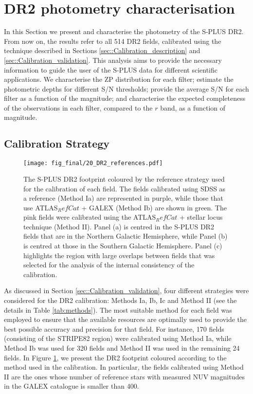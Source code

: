 \documentclass[fleqn,usenatbib]{mnras}
\begin{document}
\section{DR2 photometry characterisation}
\label{sec::DR2}

In this Section we present and characterise the photometry of the S-PLUS DR2. From now on, the results refer to all 514 DR2 fields,  calibrated using the technique described in Sections \ref{sec::Calibration_description} and \ref{sec::Calibration_validation}. This analysis aims to provide the necessary information to guide the user of the S-PLUS data for different scientific applications. We characterise the ZP distribution for each filter; estimate the photometric depths for different S/N thresholds; provide the average S/N for each filter as a function of the magnitude; and characterise the expected completeness of the observations in each filter, compared to the $r$ band, as a function of magnitude.

\subsection{Calibration Strategy}

\begin{figure}
\centering
\texttt{[image: fig\_final/20\_DR2\_references.pdf]}
\caption{The S-PLUS DR2 footprint coloured by the reference strategy used for the calibration of each field. The fields calibrated using SDSS as a reference  (Method Ia) are represented in purple, while those that use ATLAS$_RefCat$ + GALEX (Method Ib) are shown in green. The pink fields were calibrated using the ATLAS$_RefCat$ + stellar locus technique (Method II). Panel (a) is centred in the S-PLUS DR2 fields that are in the Northern Galactic Hemisphere, while Panel (b) is centred at those in the Southern Galactic Hemisphere. Panel (c) highlights the region with large overlaps between fields that was selected for the analysis of the internal consistency of the calibration.}
\label{fig:footprint_reference}
\end{figure}

As discussed in Section \ref{sec::Calibration_validation}, four different strategies were considered for the DR2 calibration: Methods Ia, Ib, Ic and Method II (see the details in Table \ref{tab:methods}). The most suitable method for each field was employed to ensure that the available resources are optimally used to provide the best possible accuracy and precision for that field. For instance, 170 fields (consisting of the STRIPE82 region) were calibrated using Method Ia, while Method Ib was used for 320 fields and Method II was used in the remaining 24 fields. In Figure \ref{fig:footprint_reference}, we present the DR2 footprint coloured according to the method used in the calibration. In particular, the fields calibrated using Method II are the ones whose number of reference stars with measured NUV magnitudes in the GALEX catalogue is smaller than 400.
\end{document}
